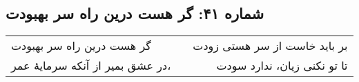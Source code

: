 \begin{center}
\section*{شماره ۴۱: گر هست درین راه سر بهبودت}
\label{sec:041}
\begin{longtable}{l p{0.5cm} r}
گر هست درین راه سر بهبودت
&&
بر باید خاست از سر هستی زودت
\\
در عشق بمیر از آنکه سرمایهٔ عمر،
&&
تا تو نکنی زیان، ندارد سودت
\\
\end{longtable}
\end{center}
